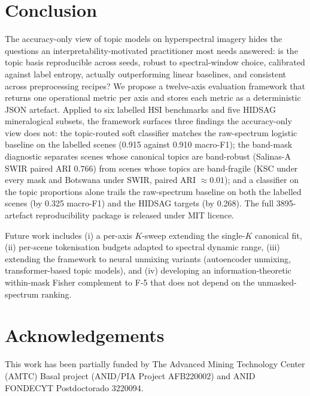 \documentclass[journal,a4paper,10pt]{IEEEtran}
\begin{document}
\section{Conclusion}
\label{sec:conclude}

The accuracy-only view of topic models on hyperspectral imagery
hides the questions an interpretability-motivated practitioner most
needs answered: is the topic basis reproducible across seeds,
robust to spectral-window choice, calibrated against label entropy,
actually outperforming linear baselines, and consistent across
preprocessing recipes? We propose a twelve-axis evaluation framework
that returns one operational metric per axis and stores each metric as
a deterministic JSON artefact. Applied to six labelled HSI benchmarks
and five HIDSAG mineralogical subsets, the framework surfaces three
findings the accuracy-only view does not: the topic-routed soft
classifier matches the raw-spectrum logistic baseline on the labelled
scenes (0.915 against 0.910 macro-F1); the
band-mask diagnostic separates scenes whose canonical topics are
band-robust (Salinas-A SWIR paired ARI $0.766$) from scenes whose
topics are band-fragile (KSC under every mask and Botswana under SWIR,
paired ARI $\approx 0.01$);
and a classifier on the topic proportions alone trails the raw-spectrum
baseline on both the labelled scenes (by 0.325 macro-F1) and the HIDSAG
targets (by 0.268). The full 3895-artefact
reproducibility package is released under MIT licence.

Future work includes (i) a per-axis $K$-sweep extending the
single-$K$ canonical fit, (ii) per-scene tokenisation budgets adapted
to spectral dynamic range, (iii) extending the framework to neural
unmixing variants (autoencoder unmixing, transformer-based topic
models), and (iv) developing an information-theoretic
within-mask Fisher complement to F-5 that does not depend on the
unmasked-spectrum ranking.

\section*{Acknowledgements}

This work has been partially funded by The Advanced Mining Technology
Center (AMTC) Basal project (ANID/PIA Project AFB220002) and ANID
FONDECYT Postdoctorado 3220094.
\end{document}
